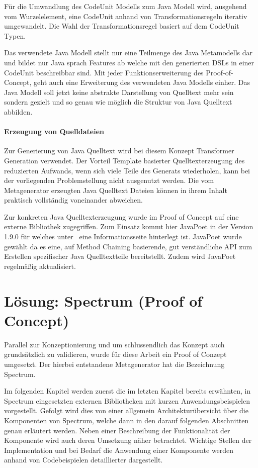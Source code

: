 \documentclass[12pt,oneside,a4paper,parskip]{scrbook}
\begin{document}
Für die Umwandlung des CodeUnit Modells zum Java Modell wird, ausgehend vom Wurzelelement, eine CodeUnit anhand von Transformationsregeln iterativ umgewandelt. Die Wahl der Transformationsregel basiert auf dem CodeUnit Typen.

Das verwendete Java Modell stellt nur eine Teilmenge des Java Metamodells dar und bildet nur Java sprach Features ab welche mit den generierten DSLs in einer CodeUnit beschreibbar sind. Mit jeder Funktionserweiterung des Proof-of-Concept, geht auch eine Erweiterung des verwendeten Java Modells einher. Das Java Modell soll jetzt keine abstrakte Darstellung von Quelltext mehr sein sondern gezielt und so genau wie möglich die Struktur von Java Quelltext abbilden.

\subsubsection{Erzeugung von Quelldateien}\label{sec:javagen}

Zur Generierung von Java Quelltext wird bei diesem Konzept Transformer Generation verwendet. Der Vorteil Template basierter Quelltexterzeugung des reduzierten Aufwands, wenn sich viele Teile des Generats wiederholen, kann bei der vorliegenden Problemstellung nicht ausgenutzt werden. Die vom Metagenerator erzeugten Java Quelltext Dateien können in ihrem Inhalt praktisch vollständig voneinander abweichen.

Zur konkreten Java Quelltexterzeugung wurde im Proof of Concept auf eine externe Bibliothek zugegriffen. Zum Einsatz kommt hier JavaPoet in der Version 1.9.0 für welches unter~\cite{javapoet2017} eine Informationsseite hinterlegt ist. JavaPoet wurde gewählt da es eine, auf Method Chaining basierende, gut verständliche API zum Erstellen spezifischer Java Quelltextteile bereitstellt. Zudem wird JavaPoet regelmäßig aktualisiert.

\chapter{Lösung: Spectrum (Proof of Concept)}

Parallel zur Konzeptionierung und um schlussendlich das Konzept auch grundsätzlich zu validieren, wurde für diese Arbeit ein Proof of Conzept umgesetzt. Der hierbei entstandene Metagenerator hat die Bezeichnung Spectrum.

Im folgenden Kapitel werden zuerst die im letzten Kapitel bereits erwähnten, in Spectrum eingesetzten externen Bibliotheken mit kurzen Anwendungsbeispielen vorgestellt. Gefolgt wird dies von einer allgemein Architekturübersicht über die Komponenten von Spectrum, welche dann in den darauf folgenden Abschnitten genau erläutert werden. Neben einer Beschreibung der Funktionalität der Komponente wird auch deren Umsetzung näher betrachtet. Wichtige Stellen der Implementation und bei Bedarf die Anwendung einer Komponente werden anhand von Codebeispielen detaillierter dargestellt.
\end{document}
